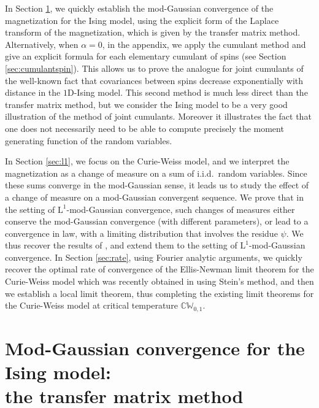 \documentclass[12pt,a4paper,reqno]{amsart}
\newcommand{\CW}{\mathbb{C}\mathbb{W}}
\theoremstyle{remark}
\begin{document}
In Section \ref{sec:ising}, we quickly establish  the mod-Gaussian convergence of the magnetization for the Ising model, using the explicit form of the Laplace transform of the magnetization, which is given by the transfer matrix method. Alternatively, when $\alpha=0$, in the appendix, we apply the cumulant method and give an explicit formula for each elementary cumulant of spins (see Section \ref{sec:cumulantspin}). This allows us to prove the analogue for joint cumulants of the well-known fact that covariances between spins decrease exponentially with distance in the $1\mathrm{D}$-Ising model. This second method  is much less direct than the transfer matrix method, but we consider the Ising model to be a very good illustration of the method of joint cumulants. Moreover it illustrates the fact that one does not necessarily need to be able to compute precisely the moment generating function of the random variables.  
\bigskip

In Section \ref{sec:l1}, we focus on the Curie-Weiss model, and we interpret the magnetization as a change of measure on a sum of i.i.d.~random variables. Since these sums converge in the mod-Gaussian sense, it leads us to study the effect of a change of measure on a mod-Gaussian convergent sequence. We prove that in the setting of $\mathrm{L}^1$-mod-Gaussian convergence, such changes of measures either conserve the mod-Gaussian convergence (with different parameters), or lead to a convergence in law, with a limiting distribution that involves the residue $\psi$. We thus recover the results of \cite{EN78,ENR80}, and extend them to the setting of $\mathrm{L}^1$-mod-Gaussian convergence. In Section \ref{sec:rate}, using Fourier analytic arguments, we quickly recover the optimal rate of convergence of the Ellis-Newman limit theorem for the Curie-Weiss model which was recently obtained in \cite{EL10} using Stein's method, and then we establish a local limit theorem, thus completing the existing limit theorems for the Curie-Weiss model at critical temperature $\CW_{0,1}$. 
\bigskip
\bigskip


















\section{Mod-Gaussian convergence for the Ising model:\\ the transfer matrix method}\label{sec:ising}
\end{document}
